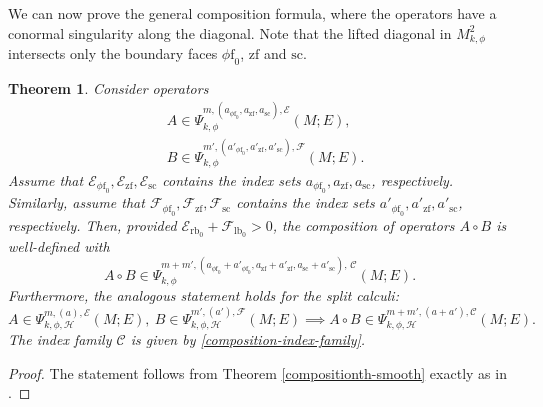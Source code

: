 \documentclass[JEP,XML,SOM,Unicode,NoFloatCountersInSection,published]{cedram}
\theoremstyle{plain}
\newtheorem{Th}{Theorem}[section]
\theoremstyle{definition}
\newcommand{\Cmath}{{\mathscr{C}}}
\newcommand\calE{{\mathcal E}}
\newcommand\calF{{\mathcal F}}
\newcommand{\calH}{{\mathscr{H}}}
\newcommand{\phif}{{\phi\mathrm{f}}}
\newcommand{\lf}{{\mathrm{lb}}}
\newcommand{\rf}{{\mathrm{rb}}}
\newcommand{\ssc}{{\mathrm{sc}}}
\newcommand{\zf}{{\mathrm{zf}}}
\begin{document}
We can now prove the general composition formula, where the operators have a conormal
singularity along the diagonal. Note that the lifted diagonal in $M^2_{k,\phi}$ intersects only the
boundary faces $\phif_0$, $\zf$ and $\ssc$.

\begin{Th} \label{compositionth}
Consider operators\vspace*{-3pt}
\begin{align*}
&A \in \Psi_{k, \phi}^{m,(a_{\phif_0},a_{\zf}, a_{\ssc}), \mathcal{E}}(M; E), \\
&B \in \Psi_{k, \phi}^{m',(a'_{\phif_0},a'_{\zf}, a'_{\ssc}), \mathcal{F}}(M; E).
\end{align*}
Assume that $\mathcal{E}_{\phif_0},\mathcal{E}_{\zf}, \mathcal{E}_{\ssc}$ contains the
index sets $a_{\phif_0},a_{\zf}, a_{\ssc}$, respectively. Similarly, assume that
$\mathcal{F}_{\phif_0}, \mathcal{F}_{\zf}, \mathcal{F}_{\ssc}$ contains the
index sets $a'_{\phif_0},a'_{\zf}, a'_{\ssc}$, respectively.
Then, provided $\mathcal{E}_{\rf_0} + \mathcal{F}_{\lf_0} > 0$, the composition of operators $A \circ B$
is well-defined with\vspace*{-3pt}
\[
A \circ B \in \Psi_{k, \phi}^{m+m',(a_{\phif_0} + a'_{\phif_0}, a_{\zf} + a'_{\zf}, a_{\ssc}
+ a'_{\ssc}), \,\mathscr{C}}(M; E).
\]
Furthermore, the analogous statement holds for the split calculi:\vspace*{-3pt}
\[
A \in\Psi^{m,(a),\calE}_{k,\phi,\calH}(M; E),\ B\in \Psi^{m',(a'),\calF}_{k,\phi,\calH}(M; E)
\implies
A\circ B \in \Psi^{m+m',(a+a'),\Cmath}_{k,\phi,\calH}(M; E).
\]
The index family $\mathscr{C}$ is given by \eqref{composition-index-family}.
\end{Th}

\begin{proof}
The statement follows from Theorem \ref{compositionth-smooth}
exactly as in \cite[\S 6]{guillarmou2008resolvent}.
\end{proof}

\backmatter


\end{document}
